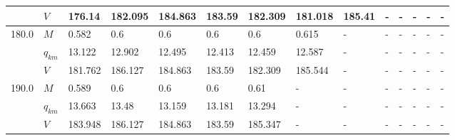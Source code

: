 \begin{tabular}{|l|l|llllllllllll|}
      & $V$ &   176.14 &  182.095 &                   184.863 &                   183.59 &  182.309\cellcolor{green} &                   181.018 &                    185.41 &        - &                         - &                         - &                         - &        - \\
\hline
180.0 & $M$ &    0.582 &      0.6 &                       0.6 &     0.6\cellcolor{green} &                       0.6 &                     0.615 &                         - &        - &                         - &                         - &                         - &        - \\
      & $q_{km}$ &   13.122 &   12.902 &                    12.495 &  12.413\cellcolor{green} &                    12.459 &                    12.587 &                         - &        - &                         - &                         - &                         - &        - \\
      & $V$ &  181.762 &  186.127 &                   184.863 &  183.59\cellcolor{green} &                   182.309 &                   185.544 &                         - &        - &                         - &                         - &                         - &        - \\
\hline
190.0 & $M$ &    0.589 &      0.6 &      0.6\cellcolor{green} &                      0.6 &                      0.61 &                         - &                         - &        - &                         - &                         - &                         - &        - \\
      & $q_{km}$ &   13.663 &    13.48 &   13.159\cellcolor{green} &                   13.181 &                    13.294 &                         - &                         - &        - &                         - &                         - &                         - &        - \\
      & $V$ &  183.948 &  186.127 &  184.863\cellcolor{green} &                   183.59 &                   185.347 &                         - &                         - &        - &                         - &                         - &                         - &        - \\
\hline
\end{tabular}